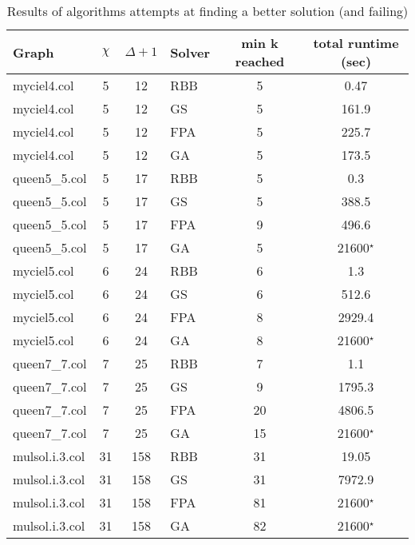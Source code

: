 \begin{table}[H]
\centering
\begin{tabular}{|l c c l c c|}
\hline
Graph & $\chi$ & $\Delta + 1$ & Solver & min k reached & total runtime (sec) \\\hline

myciel4.col    & 5  & 12  & RBB & 5 & 0.47\\
myciel4.col    & 5  & 12  & GS  & 5 & 161.9\\
myciel4.col    & 5  & 12  & FPA & 5 & 225.7\\
myciel4.col    & 5  & 12  & GA  & 5 & 173.5\\ \hline

queen5\_5.col  & 5  & 17  & RBB & 5 & 0.3\\
queen5\_5.col  & 5  & 17  & GS  & 5 & 388.5\\
queen5\_5.col  & 5  & 17  & FPA & 9 & 496.6\\
queen5\_5.col  & 5  & 17  & GA  & 5 & 21600$^\star$\\ \hline

myciel5.col    & 6  & 24  & RBB & 6 & 1.3\\
myciel5.col    & 6  & 24  & GS  & 6 & 512.6\\
myciel5.col    & 6  & 24  & FPA & 8 & 2929.4\\
myciel5.col    & 6  & 24  & GA  & 8 & 21600$^\star$\\ \hline

queen7\_7.col  & 7  & 25  & RBB & 7 & 1.1\\
queen7\_7.col  & 7  & 25  & GS  & 9 & 1795.3\\
queen7\_7.col  & 7  & 25  & FPA & 20 & 4806.5\\
queen7\_7.col  & 7  & 25  & GA  & 15 & 21600$^\star$\\ \hline

mulsol.i.3.col & 31 & 158 & RBB & 31 & 19.05\\
mulsol.i.3.col & 31 & 158 & GS  & 31 & 7972.9\\
mulsol.i.3.col & 31 & 158 & FPA & 81 & 21600$^\star$\\
mulsol.i.3.col & 31 & 158 & GA  & 82 & 21600$^\star$\\ \hline
\end{tabular}
\caption{Results of algorithms attempts at finding a better solution (and failing)}
\label{res:timeToFail}
\end{table}